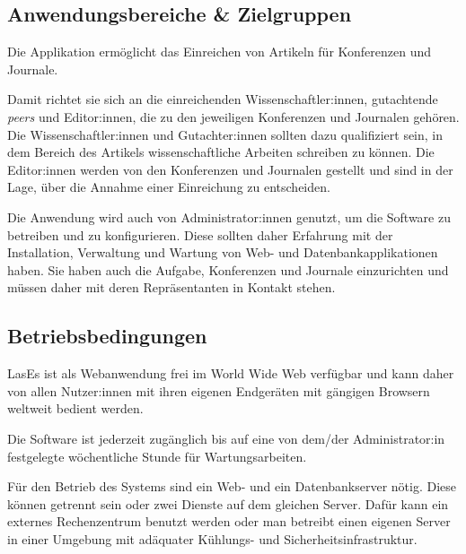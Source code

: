 
\subsection{Anwendungsbereiche \& Zielgruppen}

Die Applikation ermöglicht das Einreichen von Artikeln für Konferenzen und Journale.

Damit richtet sie sich an die einreichenden Wissenschaftler:innen, gutachtende \emph{peers} und Editor:innen, die zu den jeweiligen Konferenzen und Journalen gehören.
Die Wissenschaftler:innen und Gutachter:innen sollten dazu qualifiziert sein, in dem Bereich des Artikels wissenschaftliche Arbeiten schreiben zu können.
Die Editor:innen werden von den Konferenzen und Journalen gestellt und sind in der Lage, über die Annahme einer Einreichung zu entscheiden.

Die Anwendung wird auch von Administrator:innen genutzt, um die Software zu betreiben und zu konfigurieren.
Diese sollten daher Erfahrung mit der Installation, Verwaltung und Wartung von Web- und Datenbankapplikationen haben.
Sie haben auch die Aufgabe, Konferenzen und Journale einzurichten und müssen daher mit deren Repräsentanten in Kontakt stehen.

\subsection{Betriebsbedingungen}

LasEs ist als Webanwendung frei im World Wide Web verfügbar und kann daher von allen Nutzer:innen mit ihren eigenen Endgeräten mit gängigen Browsern weltweit bedient werden.

Die Software ist jederzeit zugänglich bis auf eine von dem/der Administrator:in festgelegte wöchentliche Stunde für Wartungsarbeiten.

Für den Betrieb des Systems sind ein Web- und ein Datenbankserver nötig.
Diese können getrennt sein oder zwei Dienste auf dem gleichen Server.
Dafür kann ein externes Rechenzentrum benutzt werden oder man betreibt einen eigenen Server in einer Umgebung mit adäquater Kühlungs- und Sicherheitsinfrastruktur.